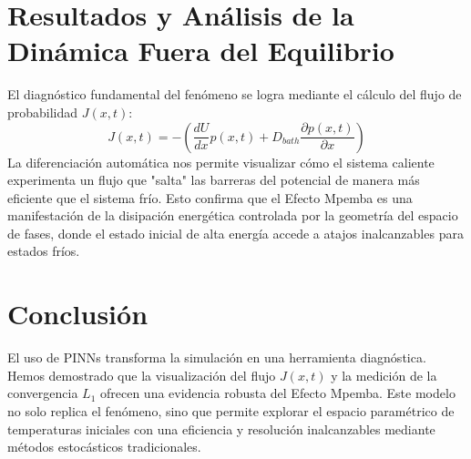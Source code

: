 \documentclass[a4paper,12pt]{article}
\begin{document}
\section{Resultados y Análisis de la Dinámica Fuera del Equilibrio}
El diagnóstico fundamental del fenómeno se logra mediante el cálculo del flujo de probabilidad $J(x,t)$:
\begin{equation}
J(x,t) = - \left( \frac{dU}{dx} p(x,t) + D_{bath} \frac{\partial p(x,t)}{\partial x} \right)
\end{equation}
La diferenciación automática nos permite visualizar cómo el sistema caliente experimenta un flujo que "salta" las barreras del potencial de manera más eficiente que el sistema frío. Esto confirma que el Efecto Mpemba es una manifestación de la disipación energética controlada por la geometría del espacio de fases, donde el estado inicial de alta energía accede a atajos inalcanzables para estados fríos.

\section{Conclusión}
El uso de PINNs transforma la simulación en una herramienta diagnóstica. Hemos demostrado que la visualización del flujo $J(x,t)$ y la medición de la convergencia $L_1$ ofrecen una evidencia robusta del Efecto Mpemba. Este modelo no solo replica el fenómeno, sino que permite explorar el espacio paramétrico de temperaturas iniciales con una eficiencia y resolución inalcanzables mediante métodos estocásticos tradicionales.
\end{document}
